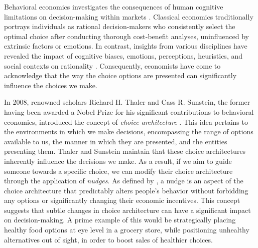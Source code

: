 \documentclass[preprint]{acmart}
\begin{document}
Behavioral economics investigates the consequences of human cognitive limitations on decision-making within markets \cite{mullainathan2001}. Classical economics traditionally portrays individuals as rational decision-makers who consistently select the optimal choice after conducting thorough cost-benefit analyses, uninfluenced by extrinsic factors or emotions. In contrast, insights from various disciplines have revealed the impact of cognitive biases, emotions, perceptions, heuristics, and social contexts on rationality \cite{halpern2015}. Consequently, economists have come to acknowledge that the way the choice options are presented can significantly influence the choices we make.



In 2008, renowned scholars Richard H. Thaler and Cass R. Sunstein, the former having been awarded a Nobel Prize for his significant contributions to behavioral economics, introduced the concept of \emph{choice architecture} \cite{thaler2008}. This idea pertains to the environments in which we make decisions, encompassing the range of options available to us, the manner in which they are presented, and the entities presenting them. Thaler and Sunstein maintain that these choice architectures inherently influence the decisions we make. As a result, if we aim to guide someone towards a specific choice, we can modify their choice architecture through the application of \emph{nudges}. As defined by \citet[p.6]{thaler2008}, a nudge is an aspect of the choice architecture that predictably alters people's behavior without forbidding any options or significantly changing their economic incentives. This concept suggests that subtle changes in choice architecture can have a significant impact on decision-making. A prime example of this would be strategically placing healthy food options at eye level in a grocery store, while positioning unhealthy alternatives out of sight, in order to boost sales of healthier choices.
\end{document}
